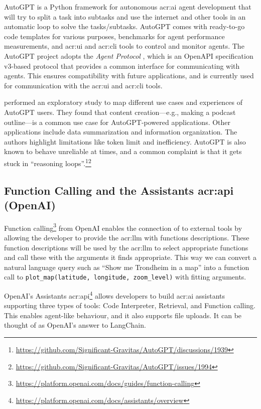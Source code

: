 AutoGPT \citep{richardAutoGPTHeartOpensource2023} is a Python framework for autonomous \acrshort{acr:ai} agent development that will try to split a task into subtasks and use the internet and other tools in an automatic loop to solve the tasks/subtasks. AutoGPT comes with ready-to-go code templates for various purposes, benchmarks for agent performance measurements, and \acrshort{acr:ui} and \acrshort{acr:cli} tools to control and monitor agents. The AutoGPT project adopts the \textit{Agent Protocol} \citep{AgentProtocol}, which is an OpenAPI specification v3-based protocol that provides a common interface for communicating with agents. This ensures compatibility with future applications, and is currently used for communication with the \acrshort{acr:ui} and \acrshort{acr:cli} tools.

\cite{firatWhatIfGPT42023} performed an exploratory study to map different use cases and experiences of AutoGPT users. They found that content creation---e.g., making a podcast outline---is a common use case for AutoGPT-powered applications. Other applications include data summarization and information organization. The authors highlight limitations like token limit and inefficiency. AutoGPT is also known to behave unreliable at times, and a common complaint is that it gets stuck in \enquote{reasoning loops}.\footnote{\url{https://github.com/Significant-Gravitas/AutoGPT/discussions/1939}}\footnote{\url{https://github.com/Significant-Gravitas/AutoGPT/issues/1994}}

\subsection[Function Calling and the Assistants API (OpenAI)]{Function Calling and the Assistants \acrshort{acr:api} (OpenAI)}

Function calling\footnote{\url{https://platform.openai.com/docs/guides/function-calling}} from OpenAI enables the connection of  to external tools by allowing the developer to provide the \acrshort{acr:llm} with functions descriptions. These function descriptions will be used by the \acrshort{acr:llm} to select appropriate functions and call these with the arguments it finds appropriate. This way we can convert a natural language query such as \enquote{Show me Trondheim in a map} into a function call to \texttt{plot\_map(latitude, longitude, zoom\_level)} with fitting arguments.

OpenAI's Assistants \acrshort{acr:api}\footnote{\url{https://platform.openai.com/docs/assistants/overview}} allows developers to build \acrshort{acr:ai} assistants supporting three types of tools: Code Interpreter, Retrieval, and Function calling. This enables agent-like behaviour, and it also supports file uploads. It can be thought of as OpenAI's answer to LangChain.

